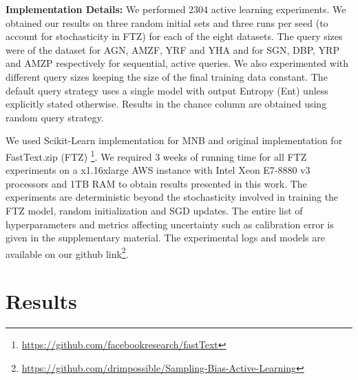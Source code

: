 \documentclass[11pt,a4paper]{article}
\begin{document}
\begin{table}[t]
    \centering
    \caption{Comparison of active text classification datasets and models (Acc on Trec-QA) used in \cite{siddhant2018deep} and our work. We use significantly larger datasets (two orders larger), perform 20x more experiments, and use more efficient and accurate models.}
    \label{tab:comparison_datasets}
\end{table}

\textbf{Implementation Details:} We performed 2304 active learning experiments. We obtained our results on three random initial sets and three runs per seed (to account for stochasticity in FTZ) for each of the eight datasets. The query sizes were  of the dataset for AGN, AMZF, YRF and YHA and  for SGN, DBP, YRP and AMZP respectively for  sequential, active queries. We also experimented with different query sizes keeping the size of the final training data  constant. The default query strategy uses a single model with output Entropy (Ent) unless explicitly stated otherwise. Results in the chance column are obtained using random query strategy.

We used Scikit-Learn \cite{scikitlearn} implementation for MNB and original implementation for FastText.zip (FTZ)  \footnote{\url{https://github.com/facebookresearch/fastText}}. 
We required 3 weeks of running time for all FTZ experiments on a x1.16xlarge AWS instance with Intel Xeon E7-8880 v3 processors and 1TB RAM to obtain results presented in this work. The experiments are deterministic beyond the stochasticity involved in training the FTZ model, random initialization and SGD updates. The entire list of hyperparameters and metrics affecting uncertainty such as calibration error \cite{guo2017calibration} is given in the supplementary material. The experimental logs and models are available on our github link\footnote{\href{https://github.com/drimpossible/Sampling-Bias-Active-Learning}{https://github.com/drimpossible/Sampling-Bias-Active-Learning}}.  \section{Results}\label{sec:results}
\end{document}
